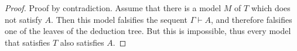 

\setcounter{section}{3}
\setcounter{subsection}{2}
\setcounter{dfn}{17}

\begin{proof}
Proof by contradiction.
Assume that there is a model $M$ of $T$ which does not satisfy $A$.
Then this model falsifies the sequent $\Gamma \vdash A$, and therefore falsifies one of the leaves of the deduction tree.
But this is impossible, thus every model that satisfies $T$ also satisfies $A$.
\end{proof}





